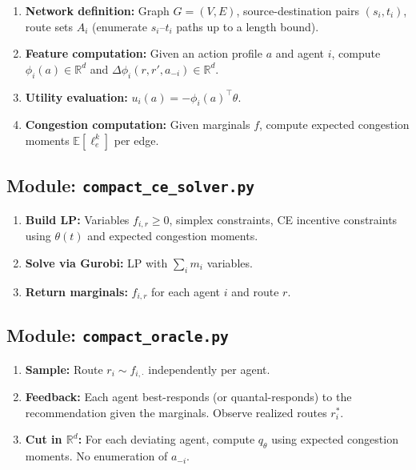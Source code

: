 \documentclass[11pt]{article}
\newcommand{\R}{\mathbb{R}}
\begin{document}
\begin{enumerate}[nosep]
    \item \textbf{Network definition:} Graph $G = (V, E)$, source-destination pairs $(s_i, t_i)$, route sets $A_i$ (enumerate $s_i$--$t_i$ paths up to a length bound).
    \item \textbf{Feature computation:} Given an action profile $a$ and agent $i$, compute $\phi_i(a) \in \R^d$ and $\Delta\phi_i(r, r', a_{-i}) \in \R^d$.
    \item \textbf{Utility evaluation:} $u_i(a) = -\phi_i(a)^\top \theta$.
    \item \textbf{Congestion computation:} Given marginals $f$, compute expected congestion moments $\mathbb{E}[\ell_e^k]$ per edge.
\end{enumerate}

\subsection{Module: \texttt{compact\_ce\_solver.py}}

\begin{enumerate}[nosep]
    \item \textbf{Build LP:} Variables $f_{i,r} \geq 0$, simplex constraints, CE incentive constraints using $\theta(t)$ and expected congestion moments.
    \item \textbf{Solve via Gurobi:} LP with $\sum_i m_i$ variables.
    \item \textbf{Return marginals:} $f_{i,r}$ for each agent $i$ and route $r$.
\end{enumerate}

\subsection{Module: \texttt{compact\_oracle.py}}

\begin{enumerate}[nosep]
    \item \textbf{Sample:} Route $r_i \sim f_{i,\cdot}$ independently per agent.
    \item \textbf{Feedback:} Each agent best-responds (or quantal-responds) to the recommendation given the marginals. Observe realized routes $r_i^*$.
    \item \textbf{Cut in $\R^d$:} For each deviating agent, compute $q_\theta$ using expected congestion moments. No enumeration of $a_{-i}$.
\end{enumerate}
\end{document}
